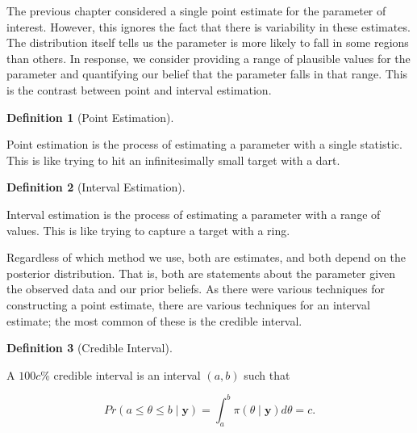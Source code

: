 \documentclass[
  letterpaper,
  DIV=11,
  numbers=noendperiod]{scrreprt}
\theoremstyle{definition}
\newtheorem{definition}{Definition}[chapter]
\theoremstyle{plain}
\theoremstyle{definition}
\theoremstyle{remark}
\begin{document}
\providecommand{\norm}[1]{\lVert#1\rVert}
\providecommand{\abs}[1]{\lvert#1\rvert}
\providecommand{\iid}{\stackrel{\text{IID}}{\sim}}
\providecommand{\ind}{\stackrel{\text{Ind}}{\sim}}

\providecommand{\bm}[1]{\mathbf{#1}}
\providecommand{\bs}[1]{\boldsymbol{#1}}
\providecommand{\bbeta}{\bs{\beta}}

\providecommand{\Ell}{\mathcal{L}}
\providecommand{\indep}{\perp\negthickspace\negmedspace\perp}

The previous chapter considered a single point estimate for the
parameter of interest. However, this ignores the fact that there is
variability in these estimates. The distribution itself tells us the
parameter is more likely to fall in some regions than others. In
response, we consider providing a range of plausible values for the
parameter and quantifying our belief that the parameter falls in that
range. This is the contrast between point and interval estimation.

\begin{definition}[Point
Estimation]\protect\hypertarget{def-point-estimation}{}\label{def-point-estimation}

Point estimation is the process of estimating a parameter with a single
statistic. This is like trying to hit an infinitesimally small target
with a dart.

\end{definition}

\begin{definition}[Interval
Estimation]\protect\hypertarget{def-interval-estimation}{}\label{def-interval-estimation}

Interval estimation is the process of estimating a parameter with a
range of values. This is like trying to capture a target with a ring.

\end{definition}

Regardless of which method we use, both are estimates, and both depend
on the posterior distribution. That is, both are statements about the
parameter given the observed data and our prior beliefs. As there were
various techniques for constructing a point estimate, there are various
techniques for an interval estimate; the most common of these is the
credible interval.

\begin{definition}[Credible
Interval]\protect\hypertarget{def-credible-interval}{}\label{def-credible-interval}

A \(100c\)\% credible interval is an interval \((a, b)\) such that

\[Pr(a \leq \theta \leq b \mid \mathbf{y}) = \int_{a}^{b} \pi(\theta \mid \mathbf{y})d\theta = c.\]

\end{definition}
\end{document}
